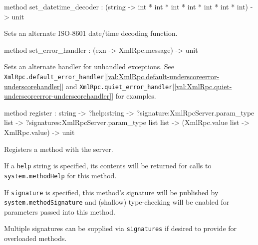 \documentclass[11pt]{article}
\begin{document}
\begin{ocamldocobjectend}
\begin{ocamldocdescription}
\end{ocamldocdescription}


\label{method:XmlRpcServer.base.set-underscoredatetime-underscoredecoder}\begin{ocamldoccode}
method set_datetime_decoder :
  (string -> int * int * int * int * int * int * int) -> unit
\end{ocamldoccode}
\begin{ocamldocdescription}
Sets an alternate ISO-8601 date/time decoding function.


\end{ocamldocdescription}


\label{method:XmlRpcServer.base.set-underscoreerror-underscorehandler}\begin{ocamldoccode}
method set_error_handler : (exn -> XmlRpc.message) -> unit
\end{ocamldoccode}
\begin{ocamldocdescription}
Sets an alternate handler for unhandled exceptions.
      See {\tt{XmlRpc.default\_error\_handler}}[\ref{val:XmlRpc.default-underscoreerror-underscorehandler}] and
      {\tt{XmlRpc.quiet\_error\_handler}}[\ref{val:XmlRpc.quiet-underscoreerror-underscorehandler}] for examples.


\end{ocamldocdescription}


\label{method:XmlRpcServer.base.register}\begin{ocamldoccode}
method register :
  string ->
  ?help:string ->
  ?signature:XmlRpcServer.param_type list ->
  ?signatures:XmlRpcServer.param_type list list ->
  (XmlRpc.value list -> XmlRpc.value) -> unit
\end{ocamldoccode}
\begin{ocamldocdescription}
Registers a method with the server.


      If a {\tt{help}} string is specified, its contents will be returned for
      calls to {\tt{system.methodHelp}} for this method.


      If {\tt{signature}} is specified, this method's signature will be published
      by {\tt{system.methodSignature}} and (shallow) type-checking will be enabled
      for parameters passed into this method.


      Multiple signatures can be supplied via {\tt{signatures}} if desired to
      provide for overloaded methods.



\end{ocamldocdescription}
\end{ocamldocobjectend}
\end{document}
